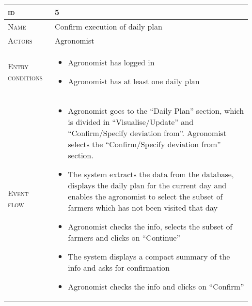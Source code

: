 

\begin{table}[H]
    \centering
    \begin{tabular}[c]{|l|p{}|}
        \hline %
    	\textsc{id}                 &   5\\
    	\hline %
    	\textsc{Name}               &   Confirm execution of daily plan\\
    	\hline %
    	\textsc{Actors}             &   Agronomist\\
    	\hline %
    	\textsc{Entry conditions}   &   \begin{itemize}
                                    	    \item Agronomist has logged in
                                    	    \item Agronomist has at least one daily plan
                                        \end{itemize}\\
    	\hline %
    	\textsc{Event flow}         &   %
            	                        \begin{itemize}
                                    	    \item Agronomist goes to the “Daily Plan” section, which is divided in “Visualise/Update” and “Confirm/Specify deviation from”. Agronomist selects the “Confirm/Specify deviation from” section.
                                    		\item The system extracts the data from the database, displays the daily plan for the current day and enables the agronomist to select the subset of farmers which has not been visited that day
                                            \item Agronomist checks the info, selects the subset of farmers and clicks on “Continue”
                                            \item The system displays a compact summary of the info and asks for confirmation
                                            \item Agronomist checks the info and clicks on “Confirm”


\end{itemize}
\end{tabular}
\end{table}

